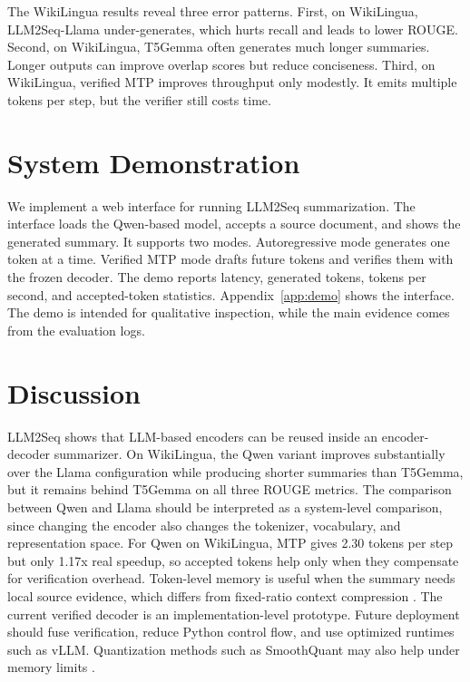 \documentclass[11pt]{article}
\begin{document}
The WikiLingua results reveal three error patterns.
First, on WikiLingua, LLM2Seq-Llama under-generates, which hurts recall and leads to lower ROUGE.
Second, on WikiLingua, T5Gemma often generates much longer summaries.
Longer outputs can improve overlap scores but reduce conciseness.
Third, on WikiLingua, verified MTP improves throughput only modestly.
It emits multiple tokens per step, but the verifier still costs time.

\section{System Demonstration}
\label{sec:demo}

We implement a web interface for running LLM2Seq summarization.
The interface loads the Qwen-based model, accepts a source document, and shows the generated summary.
It supports two modes.
Autoregressive mode generates one token at a time.
Verified MTP mode drafts future tokens and verifies them with the frozen decoder.
The demo reports latency, generated tokens, tokens per second, and accepted-token statistics.
Appendix~\ref{app:demo} shows the interface.
The demo is intended for qualitative inspection, while the main evidence comes from the evaluation logs.

\section{Discussion}
\label{sec:discussion}

LLM2Seq shows that LLM-based encoders can be reused inside an encoder-decoder summarizer.
On WikiLingua, the Qwen variant improves substantially over the Llama configuration while producing shorter summaries than T5Gemma, but it remains behind T5Gemma on all three ROUGE metrics.
The comparison between Qwen and Llama should be interpreted as a system-level comparison, since changing the encoder also changes the tokenizer, vocabulary, and representation space.
For Qwen on WikiLingua, MTP gives 2.30 tokens per step but only 1.17x real speedup, so accepted tokens help only when they compensate for verification overhead.
Token-level memory is useful when the summary needs local source evidence, which differs from fixed-ratio context compression \citep{li2026contextcompression}.
The current verified decoder is an implementation-level prototype.
Future deployment should fuse verification, reduce Python control flow, and use optimized runtimes such as vLLM.
Quantization methods such as SmoothQuant may also help under memory limits \citep{xiao2023smoothquant}.
\end{document}
